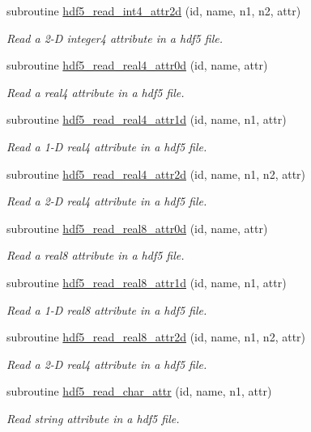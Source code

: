 \begin{DoxyCompactItemize}
subroutine \hyperlink{classmodhdf5_a4ca8f47995bf9df5b6c892781c87dd95}{hdf5\-\_\-read\-\_\-int4\-\_\-attr2d} (id, name, n1, n2, attr)
\begin{DoxyCompactList}\small\item\em Read a 2-\/\-D integer4 attribute in a hdf5 file. \end{DoxyCompactList}\item 
subroutine \hyperlink{classmodhdf5_a6cf3b8369d7cbc96e8639439eb7c51ff}{hdf5\-\_\-read\-\_\-real4\-\_\-attr0d} (id, name, attr)
\begin{DoxyCompactList}\small\item\em Read a real4 attribute in a hdf5 file. \end{DoxyCompactList}\item 
subroutine \hyperlink{classmodhdf5_acd7e7ad91ecc73c632ddc76468dbd083}{hdf5\-\_\-read\-\_\-real4\-\_\-attr1d} (id, name, n1, attr)
\begin{DoxyCompactList}\small\item\em Read a 1-\/\-D real4 attribute in a hdf5 file. \end{DoxyCompactList}\item 
subroutine \hyperlink{classmodhdf5_a783cb12e2d85f812c506fff7cc69f37a}{hdf5\-\_\-read\-\_\-real4\-\_\-attr2d} (id, name, n1, n2, attr)
\begin{DoxyCompactList}\small\item\em Read a 2-\/\-D real4 attribute in a hdf5 file. \end{DoxyCompactList}\item 
subroutine \hyperlink{classmodhdf5_ad2a6c1b4f0229be1ac9f4e4eb0556af4}{hdf5\-\_\-read\-\_\-real8\-\_\-attr0d} (id, name, attr)
\begin{DoxyCompactList}\small\item\em Read a real8 attribute in a hdf5 file. \end{DoxyCompactList}\item 
subroutine \hyperlink{classmodhdf5_a5010be0e91c8d56afbd40530b8064d6a}{hdf5\-\_\-read\-\_\-real8\-\_\-attr1d} (id, name, n1, attr)
\begin{DoxyCompactList}\small\item\em Read a 1-\/\-D real8 attribute in a hdf5 file. \end{DoxyCompactList}\item 
subroutine \hyperlink{classmodhdf5_a85144bc1c41d08550379f855b3974507}{hdf5\-\_\-read\-\_\-real8\-\_\-attr2d} (id, name, n1, n2, attr)
\begin{DoxyCompactList}\small\item\em Read a 2-\/\-D real4 attribute in a hdf5 file. \end{DoxyCompactList}\item 
subroutine \hyperlink{classmodhdf5_a2da336bc6d0ebbf1e6d582469b741a63}{hdf5\-\_\-read\-\_\-char\-\_\-attr} (id, name, n1, attr)
\begin{DoxyCompactList}\small\item\em Read string attribute in a hdf5 file. \end{DoxyCompactList}\end{DoxyCompactItemize}
